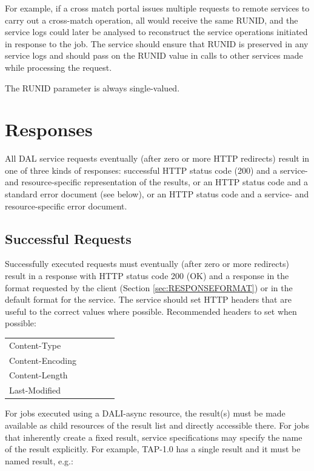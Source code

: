 \documentclass[11pt,letter]{ivoa}
\begin{document}
For example, if a cross match portal issues multiple requests to remote services 
to carry out a cross-match operation, all would receive the same RUNID, and the 
service logs could later be analysed to reconstruct the service operations 
initiated in response to the job. The service should ensure that RUNID is 
preserved in any service logs and  should pass on the RUNID value in calls to 
other services made while processing the request.

The RUNID parameter is always single-valued.

\section{Responses}
\label{sec:responses}
All DAL service requests eventually (after zero or more HTTP redirects) result 
in one of three kinds of responses: 
successful HTTP status code (200) and a service- and resource-specific 
representation of the results, or an HTTP status code and a standard error 
document (see below), or an HTTP status code and a service- and 
resource-specific error document.

\subsection{Successful Requests}
\label{sec:response-ok}
Successfully executed requests must eventually (after zero or more redirects) 
result in a response with HTTP status code 200 (OK) and a response in the format 
requested by the client (Section \ref{sec:RESPONSEFORMAT}) or in the default format for the 
service. The service should set HTTP headers \citep{std:HTTP} that are useful to the correct values 
where possible. Recommended headers to set when possible:

\begin{tabular}{l l l l l}
\label{tab:headers}
Content-Type \\
Content-Encoding \\
Content-Length \\
Last-Modified \\
\end{tabular}

For jobs executed using a DALI-async resource, the result(s) must be made 
available as child resources of the result list and directly accessible there. 
For jobs that inherently create a fixed result, service specifications may 
specify the name of the result explicitly. For example, TAP-1.0 has a single 
result and it must be named result, e.g.:
\end{document}
